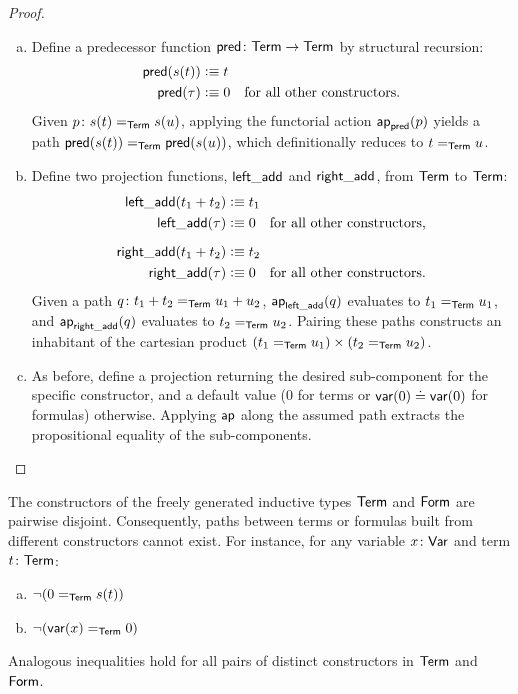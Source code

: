 \begin{proof}\ 
    \begin{enumerate}[a)]
        \item Define a predecessor function $\fun{pred}\colon\fun{Term}\to\fun{Term}$ by structural recursion:
        \begin{align*}
            \mathsf{pred}(s(t)) &\mathrel{\vcentcolon}\equiv t \\
            \mathsf{pred}(\tau) &\mathrel{\vcentcolon}\equiv 0 \quad \text{for all other constructors.}
        \end{align*}
        Given $p\colon s(t)\eq{\fun{Term}}s(u)$, applying the functorial action $\mathsf{ap}_{\mathsf{pred}}(p)$ yields a path $\mathsf{pred}(s(t))\mathrel{=_{\mathsf{Term}}}\mathsf{pred}(s(u))$, which definitionally reduces to $t\mathrel{=_{\mathsf{Term}}}u$.
        
        \item Define two projection functions, $\mathsf{left\_add}$ and $\mathsf{right\_add}$, from $\mathsf{Term}$ to $\mathsf{Term}$:
        \begin{align*}
            \mathsf{left\_add}(t_1 + t_2) &\mathrel{\vcentcolon}\equiv t_1 \\
            \mathsf{left\_add}(\tau) &\mathrel{\vcentcolon}\equiv 0 \quad \text{for all other constructors,} \\[2mm]
            \mathsf{right\_add}(t_1 + t_2) &\mathrel{\vcentcolon}\equiv t_2 \\
            \mathsf{right\_add}(\tau) &\mathrel{\vcentcolon}\equiv 0 \quad \text{for all other constructors.}
        \end{align*}
        Given a path $q\colon t_1+t_2\eq{\fun{Term}}u_1+u_2$, $\mathsf{ap}_{\mathsf{left\_add}}(q)$ evaluates to $t_1\mathrel{=_{\mathsf{Term}}}u_1$, and $\mathsf{ap}_{\mathsf{right\_add}}(q)$ evaluates to $t_2\mathrel{=_{\mathsf{Term}}}u_2$. Pairing these paths constructs an inhabitant of the cartesian product $(t_1\mathrel{=_{\mathsf{Term}}}u_1)\times(t_2\mathrel{=_{\mathsf{Term}}}u_2)$.
        
        \item As before, define a projection returning the desired sub-component for the specific constructor, and a default value ($0$ for terms or $\mathsf{var}(0)\doteq\mathsf{var}(0)$ for formulas) otherwise. Applying $\mathsf{ap}$ along the assumed path extracts the propositional equality of the sub-components.
    \end{enumerate}
\end{proof}

\begin{thm}
    \label{thm:constructor-disjointness}
    The constructors of the freely generated inductive types\/ $\mathsf{Term}$ and\/ $\mathsf{Form}$ are pairwise disjoint. Consequently, paths between terms or formulas built from different constructors cannot exist. For instance, for any variable\/ $x\colon\fun{Var}$ and term\/ $t\colon\fun{Term}$:
    \begin{enumerate}[a),font=\upshape]
        \item $\neg(0\mathrel{=_{\mathsf{Term}}}s(t))$
        \item $\neg(\mathsf{var}(x)\mathrel{=_{\mathsf{Term}}}0)$
    \end{enumerate}
    Analogous inequalities hold for all pairs of distinct constructors in\/ $\mathsf{Term}$ and\/ $\mathsf{Form}$.
\end{thm}

